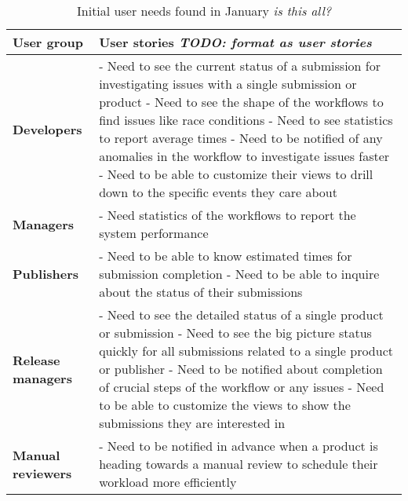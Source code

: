 \documentclass[english,12pt,a4paper,pdftex,sci,utf8]{aaltothesis}
\newcommand{\nyi}[1]{\colorbox{nyibg}{\textcolor{nyitext}{\emph{#1}}}}
\begin{document}
\begin{table}[htb]
\begin{center}
\begin{tabularx}{\linewidth}{| l | X |}
\hline
\textbf{User group} & \textbf{User stories} \nyi{TODO: format as user stories} \\
\hline \hline
\textbf{Developers} & 
- Need to see the current status of a submission for investigating issues with a single submission or product \newline 
- Need to see the shape of the workflows to find issues like race conditions\newline
- Need to see statistics to report average times \newline
- Need to be notified of any anomalies in the workflow to investigate issues faster\newline
- Need to be able to customize their views to drill down to the specific events they care about\\
\hline
\textbf{Managers} & 
- Need statistics of the workflows to report the system performance \\
\hline
\textbf{Publishers} & 
- Need to be able to know estimated times for submission completion \newline
- Need to be able to inquire about the status of their submissions \\
\hline
\textbf{Release managers} &
- Need to see the detailed status of a single product or submission \newline
- Need to see the big picture status quickly for all submissions related to a single product or publisher \newline
- Need to be notified about completion of crucial steps of the workflow or any issues \newline
- Need to be able to customize the views to show the submissions they are interested in \\
\hline
\textbf{Manual reviewers} & 
- Need to be notified in advance when a product is heading towards a manual review to schedule their workload more efficiently \\
\hline
\end{tabularx}
\end{center}
\caption{Initial user needs found in January \nyi{is this all?}}
\label{tab:userneeds}
\end{table}

\end{document}

